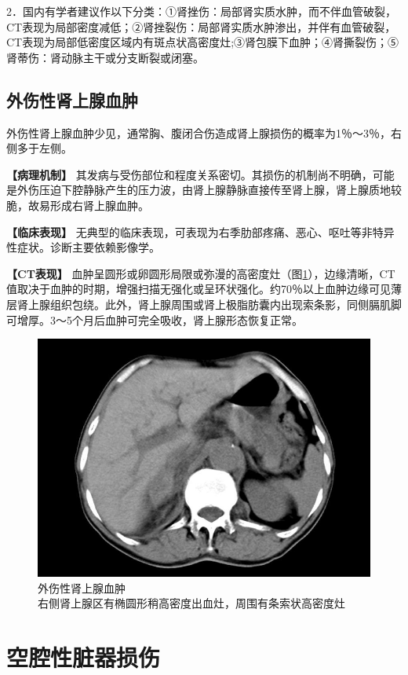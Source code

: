 2．国内有学者建议作以下分类：①肾挫伤：局部肾实质水肿，而不伴血管破裂，CT表现为局部密度减低；②肾挫裂伤：局部肾实质水肿渗出，并伴有血管破裂，CT表现为局部低密度区域内有斑点状高密度灶;③肾包膜下血肿；④肾撕裂伤；⑤肾蒂伤：肾动脉主干或分支断裂或闭塞。

\subsection{外伤性肾上腺血肿}

外伤性肾上腺血肿少见，通常胸、腹闭合伤造成肾上腺损伤的概率为1％～3％，右侧多于左侧。

\textbf{【病理机制】}
其发病与受伤部位和程度关系密切。其损伤的机制尚不明确，可能是外伤压迫下腔静脉产生的压力波，由肾上腺静脉直接传至肾上腺，肾上腺质地较脆，故易形成右肾上腺血肿。

\textbf{【临床表现】}
无典型的临床表现，可表现为右季肋部疼痛、恶心、呕吐等非特异性症状。诊断主要依赖影像学。

\textbf{【CT表现】}
血肿呈圆形或卵圆形局限或弥漫的高密度灶（图\ref{fig20-6}），边缘清晰，CT值取决于血肿的时期，增强扫描无强化或呈环状强化。约70％以上血肿边缘可见薄层肾上腺组织包绕。此外，肾上腺周围或肾上极脂肪囊内出现索条影，同侧膈肌脚可增厚。3～5个月后血肿可完全吸收，肾上腺形态恢复正常。

\begin{figure}[!htbp]
 \centering
 \includegraphics[width=.7\textwidth,height=\textheight,keepaspectratio]{./images/Image00395.jpg}
 \captionsetup{justification=centering}
 \caption{外伤性肾上腺血肿\\{\small 右侧肾上腺区有椭圆形稍高密度出血灶，周围有条索状高密度灶}}
 \label{fig20-6}
  \end{figure} 

\section{空腔性脏器损伤}

